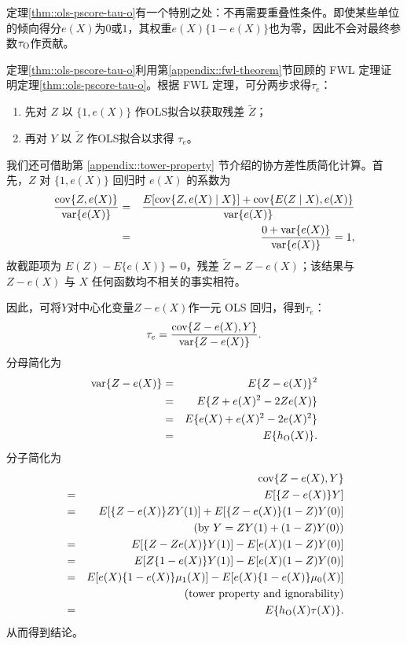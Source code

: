 定理\ref{thm::ols-pscore-tau-o}有一个特别之处：不再需要重叠性条件。即使某些单位的倾向得分$e(X)$为$0$或$1$，其权重$ e(X) \{ 1- e(X) \}$也为零，因此不会对最终参数$ \tau_\textsc{O} $作贡献。 


\begin{myproof}{定理}{\ref{thm::ols-pscore-tau-o}}利用第\ref{appendix::fwl-theorem}节回顾的 FWL 定理证明定理\ref{thm::ols-pscore-tau-o}。根据 FWL 定理，可分两步求得$\tau_e$：
\begin{enumerate}
\item
先对 $Z$ 以 $\{1, e(X)\}$ 作OLS拟合以获取残差 $\tilde{Z}$；
\item
再对 $Y$ 以 $\tilde{Z}$ 作OLS拟合以求得 $\tau_e$。 
\end{enumerate}


我们还可借助第 \ref{appendix::tower-property} 节介绍的协方差性质简化计算。首先，$Z$ 对 $\{1, e(X)\}$ 回归时 $e(X)$ 的系数为
\begin{eqnarray*}
\frac{ \textup{cov}\{Z, e(X)  \}  }{  \textup{var}\{ e(X) \} }
&=&  \frac{  E [ \textup{cov}\{Z, e(X)  \mid X\}  ] + \textup{cov}\{  E(Z\mid X), e(X) \}   }{  \textup{var}\{ e(X) \}  } \\
&=& \frac{0 +\textup{var}\{ e(X) \}  }{ \textup{var}\{ e(X) \} } = 1,
\end{eqnarray*}
故截距项为 $E(Z) - E\{e(X)\} = 0$，残差 $\tilde{Z} = Z - e(X)$；该结果与 $Z - e(X)$ 与 $X$ 任何函数均不相关的事实相符。 

因此，可将$Y$对中心化变量$Z - e(X)$作一元 OLS 回归，得到$\tau_e$：
$$
\tau_e = 
\frac{ \textup{cov}\{  Z-e(X) , Y \}  }{  \textup{var}\{ Z - e(X) \} } .
$$
分母简化为
\begin{eqnarray*}
\textup{var}\{ Z - e(X) \} &=& E\{ Z - e(X)\}^2 \\
&=& E\{ Z + e(X)^2 - 2Ze(X)\} \\
&=&E\{ e(X) + e(X)^2 - 2e(X)^2 \} \\
&=&E\{ h_\textsc{O}(X) \} .
\end{eqnarray*}
分子简化为
\begin{eqnarray*}
&&\textup{cov}\{ Z-e(X)  , Y\} \\
&=&  E[ \{ Z-e(X)  \} Y ] \\
&=& E[ \{ Z-e(X)  \} ZY(1) ] + E[ \{ Z-e(X)  \} (1-Z)Y(0) ] \\
&& \quad\quad\quad\quad (\text{by } Y = ZY(1)  + (1-Z)Y(0)) \\
&=& E[ \{ Z- Ze(X)  \} Y(1)]  - E[  e(X)  (1-Z)Y(0) ]  \\
&=&  E[  Z\{ 1- e(X)  \} Y(1) ] - E [ e(X)  (1-Z)Y(0) ] \\
&=& E[  e(X)\{ 1- e(X)  \} \mu_1(X)]  - E[  e(X)  \{ 1- e(X)  \}  \mu_0(X) ]\\
&&   \quad\quad\quad\quad (\text{tower property and ignorability}) \\
&=& E\{ h_\textsc{O}(X) \tau(X) \} .
\end{eqnarray*}
从而得到结论。 
 \end{myproof}
 
